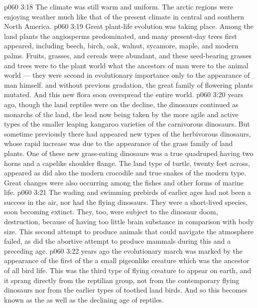 \vs p060 3:18 The climate was still warm and uniform. The arctic regions were enjoying weather much like that of the present climate in central and southern North America.
\vs p060 3:19 Great plant\hyp{}life evolution was taking place. Among the land plants the angiosperms predominated, and many present\hyp{}day trees first appeared, including beech, birch, oak, walnut, sycamore, maple, and modern palms. Fruits, grasses, and cereals were abundant, and these seed\hyp{}bearing grasses and trees were to the plant world what the ancestors of man were to the animal world --- they were second in evolutionary importance only to the appearance of man himself.  and without previous gradation, the great family of flowering plants mutated. And this new flora soon overspread the entire world.
\vs p060 3:20 \pc {} years ago, though the land reptiles were on the decline, the dinosaurs continued as monarchs of the land, the lead now being taken by the more agile and active types of the smaller leaping kangaroo varieties of the carnivorous dinosaurs. But sometime previously there had appeared new types of the herbivorous dinosaurs, whose rapid increase was due to the appearance of the grass family of land plants. One of these new grass\hyp{}eating dinosaurs was a true quadruped having two horns and a capelike shoulder flange. The land type of turtle, twenty feet across, appeared as did also the modern crocodile and true snakes of the modern type. Great changes were also occurring among the fishes and other forms of marine life.
\vs p060 3:21 The wading and swimming prebirds of earlier ages had not been a success in the air, nor had the flying dinosaurs. They were a short\hyp{}lived species, soon becoming extinct. They, too, were subject to the dinosaur doom, destruction, because of having too little brain substance in comparison with body size. This second attempt to produce animals that could navigate the atmosphere failed, as did the abortive attempt to produce mammals during this and a preceding age.
\vs p060 3:22 \pc {} years ago the evolutionary march was marked by the  appearance of the first of the  a small pigeonlike creature which was the ancestor of all bird life. This was the third type of flying creature to appear on earth, and it sprang directly from the reptilian group, not from the contemporary flying dinosaurs nor from the earlier types of toothed land birds. And so this becomes known as the  as well as the declining age of reptiles.

